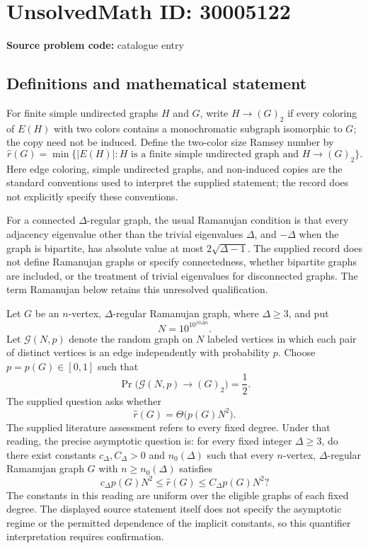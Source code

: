 \documentclass[11pt]{article}
\begin{document}
\section*{UnsolvedMath ID: 30005122}
\textbf{Source problem code:} catalogue entry
\subsection{Definitions and mathematical statement}
For finite simple undirected graphs \(H\) and \(G\), write \(H\to(G)_2\) if every coloring of \(E(H)\) with two colors contains a monochromatic subgraph isomorphic to \(G\); the copy need not be induced. Define the two-color size Ramsey number by
\[
\widehat r(G)=\min\bigl\{|E(H)|:H\text{ is a finite simple undirected graph and }H\to(G)_2\bigr\}.
\]
Here edge coloring, simple undirected graphs, and non-induced copies are the standard conventions used to interpret the supplied statement; the record does not explicitly specify these conventions.

For a connected \(\Delta\)-regular graph, the usual Ramanujan condition is that every adjacency eigenvalue other than the trivial eigenvalues \(\Delta\), and \(-\Delta\) when the graph is bipartite, has absolute value at most \(2\sqrt{\Delta-1}\). The supplied record does not define Ramanujan graphs or specify connectedness, whether bipartite graphs are included, or the treatment of trivial eigenvalues for disconnected graphs. The term Ramanujan below retains this unresolved qualification.

Let \(G\) be an \(n\)-vertex, \(\Delta\)-regular Ramanujan graph, where \(\Delta\geq3\), and put
\[
N=10^{10^{10\Delta n}}.
\]
Let \(\mathcal G(N,p)\) denote the random graph on \(N\) labeled vertices in which each pair of distinct vertices is an edge independently with probability \(p\). Choose \(p=p(G)\in[0,1]\) such that
\[
\Pr\bigl(\mathcal G(N,p)\to(G)_2\bigr)=\frac12.
\]
The supplied question asks whether
\[
\widehat r(G)=\Theta\!\bigl(p(G)N^2\bigr).
\]
The supplied literature assessment refers to every fixed degree. Under that reading, the precise asymptotic question is: for every fixed integer \(\Delta\geq3\), do there exist constants \(c_\Delta,C_\Delta>0\) and \(n_0(\Delta)\) such that every \(n\)-vertex, \(\Delta\)-regular Ramanujan graph \(G\) with \(n\geq n_0(\Delta)\) satisfies
\[
c_\Delta p(G)N^2\leq\widehat r(G)\leq C_\Delta p(G)N^2?
\]
The constants in this reading are uniform over the eligible graphs of each fixed degree. The displayed source statement itself does not specify the asymptotic regime or the permitted dependence of the implicit constants, so this quantifier interpretation requires confirmation.
\end{document}
